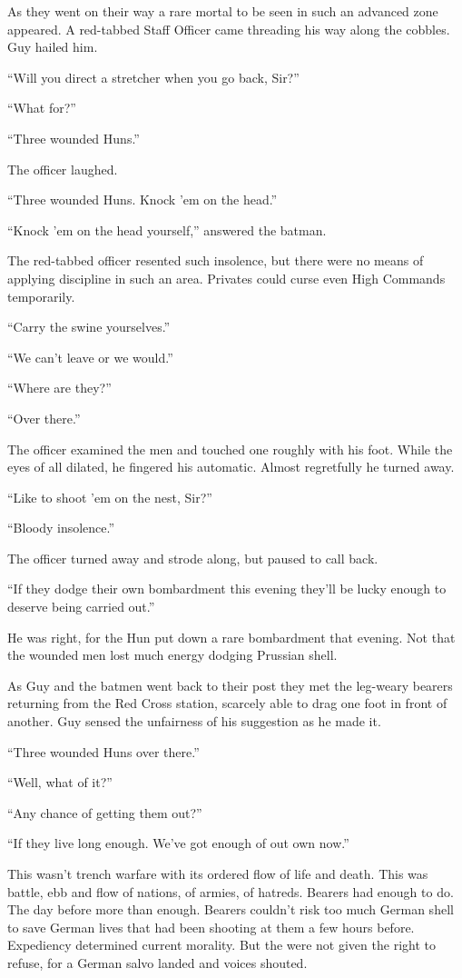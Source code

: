 As they went on their way a rare mortal to be seen in such an advanced zone appeared. A red-tabbed Staff Officer came threading his way along the cobbles. Guy hailed him.

``Will you direct a stretcher when you go back, Sir?''

``What for?''

``Three wounded Huns.''

The officer laughed.

``Three wounded Huns. Knock 'em on the head.''

``Knock 'em on the head yourself,'' answered the batman.

The red-tabbed officer resented such insolence, but there were no means of applying discipline in such an area. Privates could curse even High Commands temporarily.

``Carry the swine yourselves.''

``We can't leave or we would.''

``Where are they?''

``Over there.''

The officer examined the men and touched one roughly with his foot. While the eyes of all dilated, he fingered his automatic. Almost regretfully he turned away.

``Like to shoot 'em on the nest, Sir?''

``Bloody insolence.''

The officer turned away and strode along, but paused to call back.

``If they dodge their own bombardment this evening they'll be lucky enough to deserve being carried out.''

He was right, for the Hun put down a rare bombardment that evening. Not that the wounded men lost much energy dodging Prussian shell.

As Guy and the batmen went back to their post they met the leg-weary bearers returning from the Red Cross station, scarcely able to drag one foot in front of another. Guy sensed the unfairness of his suggestion as he made it.

``Three wounded Huns over there.''

``Well, what of it?''

``Any chance of getting them out?''

``If they live long enough. We've got enough of out own now.''

This wasn't trench warfare with its ordered flow of life and death. This was battle, ebb and flow of nations, of armies, of hatreds. Bearers had enough to do. The day before more than enough. Bearers couldn't risk too much German shell to save German lives that had been shooting at them a few hours before. Expediency determined current morality. But the were not given the right to refuse,  for a German salvo landed and voices shouted.

